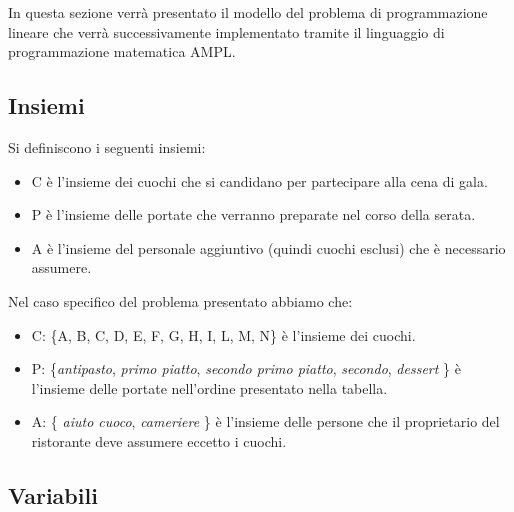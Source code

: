 \documentclass[../modello-progetto.tex]{subfiles}
\begin{document}
In questa sezione verrà presentato il modello del problema di programmazione lineare che verrà successivamente implementato tramite il linguaggio di programmazione matematica AMPL.

\subsection{Insiemi}
\label{sec:insiemi}
Si definiscono i seguenti insiemi:
\begin{itemize}
	\item C è l'insieme dei cuochi che si candidano per partecipare alla cena di gala.
	\item P è l'insieme delle portate che verranno preparate nel corso della serata.
	\item A è l'insieme del personale aggiuntivo (quindi cuochi esclusi) che è necessario assumere.
\end{itemize}
Nel caso specifico del problema presentato abbiamo che:
\begin{itemize}
	\item C: \{A, B, C, D, E, F, G, H, I, L, M, N\} è l'insieme dei cuochi.
	\item P: \{\textit{antipasto}, \textit{primo piatto}, \textit{secondo primo piatto}, \textit{secondo}, \textit{dessert} \} è l'insieme delle portate nell'ordine presentato nella tabella.
	\item A: \{ \textit{aiuto cuoco}, \textit{cameriere} \} è l'insieme delle persone che il proprietario del ristorante deve assumere eccetto i cuochi.
\end{itemize}

\subsection{Variabili}
\label{sub:variabili}
\end{document}
